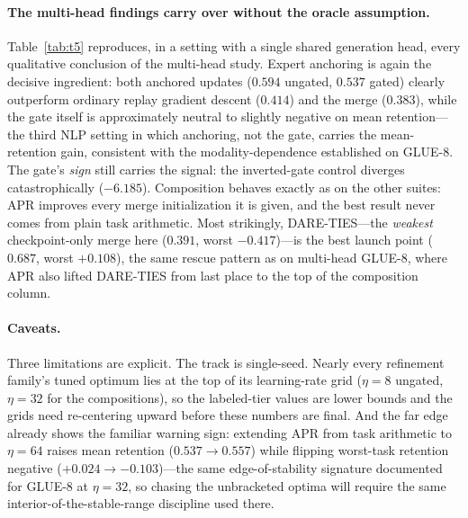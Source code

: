 \documentclass[11pt]{article}
\begin{document}
\paragraph{The multi-head findings carry over without the oracle assumption.}
Table~\ref{tab:t5} reproduces, in a setting with a single shared generation head, every qualitative conclusion of the multi-head study. Expert anchoring is again the decisive ingredient: both anchored updates ($0.594$ ungated, $0.537$ gated) clearly outperform ordinary replay gradient descent ($0.414$) and the merge ($0.383$), while the gate itself is approximately neutral to slightly negative on mean retention---the third NLP setting in which anchoring, not the gate, carries the mean-retention gain, consistent with the modality-dependence established on GLUE-8. The gate's \emph{sign} still carries the signal: the inverted-gate control diverges catastrophically ($-6.185$). Composition behaves exactly as on the other suites: APR improves every merge initialization it is given, and the best result never comes from plain task arithmetic. Most strikingly, DARE-TIES---the \emph{weakest} checkpoint-only merge here ($0.391$, worst $-0.417$)---is the best launch point ($\mathbf{0.687}$, worst $+0.108$), the same rescue pattern as on multi-head GLUE-8, where APR also lifted DARE-TIES from last place to the top of the composition column.

\paragraph{Caveats.}
Three limitations are explicit. The track is single-seed. Nearly every refinement family's tuned optimum lies at the top of its learning-rate grid ($\eta=8$ ungated, $\eta=32$ for the compositions), so the labeled-tier values are lower bounds and the grids need re-centering upward before these numbers are final. And the far edge already shows the familiar warning sign: extending APR from task arithmetic to $\eta=64$ raises mean retention ($0.537\to0.557$) while flipping worst-task retention negative ($+0.024\to-0.103$)---the same edge-of-stability signature documented for GLUE-8 at $\eta=32$, so chasing the unbracketed optima will require the same interior-of-the-stable-range discipline used there.
\end{document}
